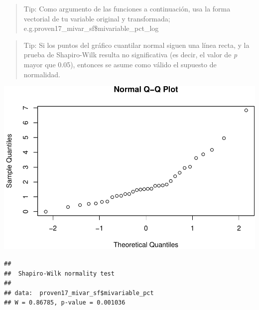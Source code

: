 \documentclass[11pt,]{article}
\newenvironment{Shaded}{\begin{snugshade}}{\end{snugshade}}
\newcommand{\KeywordTok}[1]{\textcolor[rgb]{0.13,0.29,0.53}{\textbf{#1}}}
\newcommand{\CommentTok}[1]{\textcolor[rgb]{0.56,0.35,0.01}{\textit{#1}}}
\newcommand{\OperatorTok}[1]{\textcolor[rgb]{0.81,0.36,0.00}{\textbf{#1}}}
\newcommand{\NormalTok}[1]{#1}
\begin{document}
\begin{quote}
Tip: Como argumento de las funciones a continuación, usa la forma
vectorial de tu variable original y transformada;
e.g.proven17\_mivar\_sf\$mivariable\_pct\_log
\end{quote}

\begin{quote}
Tip: Si los puntos del gráfico cuantilar normal siguen una línea recta,
y la prueba de Shapiro-Wilk resulta no significativa (es decir, el valor
de \emph{p} mayor que 0.05), entonces se asume como válido el supuesto
de normalidad.
\end{quote}

\begin{Shaded}
\end{Shaded}

\includegraphics{proyecto_files/figure-latex/unnamed-chunk-21-1.pdf}

\begin{Shaded}
\end{Shaded}

\begin{verbatim}
## 
##  Shapiro-Wilk normality test
## 
## data:  proven17_mivar_sf$mivariable_pct
## W = 0.86785, p-value = 0.001036
\end{verbatim}
\end{document}
